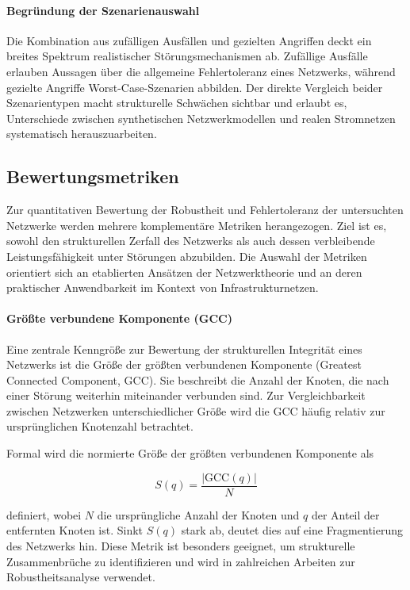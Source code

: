 \paragraph{Begründung der Szenarienauswahl}
Die Kombination aus zufälligen Ausfällen und gezielten Angriffen deckt ein
breites Spektrum realistischer Störungsmechanismen ab. Zufällige Ausfälle
erlauben Aussagen über die allgemeine Fehlertoleranz eines Netzwerks, während
gezielte Angriffe Worst-Case-Szenarien abbilden. Der direkte Vergleich beider
Szenarientypen macht strukturelle Schwächen sichtbar und erlaubt es,
Unterschiede zwischen synthetischen Netzwerkmodellen und realen Stromnetzen
systematisch herauszuarbeiten.


\subsection{Bewertungsmetriken}

Zur quantitativen Bewertung der Robustheit und Fehlertoleranz der
untersuchten Netzwerke werden mehrere komplementäre Metriken herangezogen.
Ziel ist es, sowohl den strukturellen Zerfall des Netzwerks als auch dessen
verbleibende Leistungsfähigkeit unter Störungen abzubilden. Die Auswahl der
Metriken orientiert sich an etablierten Ansätzen der Netzwerktheorie und an
deren praktischer Anwendbarkeit im Kontext von Infrastrukturnetzen.

\paragraph{Größte verbundene Komponente (GCC)}
Eine zentrale Kenngröße zur Bewertung der strukturellen Integrität eines
Netzwerks ist die Größe der größten verbundenen Komponente (Greatest Connected
Component, GCC). Sie beschreibt die Anzahl der Knoten, die nach einer Störung
weiterhin miteinander verbunden sind. Zur Vergleichbarkeit zwischen Netzwerken
unterschiedlicher Größe wird die GCC häufig relativ zur ursprünglichen
Knotenzahl betrachtet.

Formal wird die normierte Größe der größten verbundenen Komponente als


\[
S(q) = \frac{|\text{GCC}(q)|}{N}
\]


definiert, wobei $N$ die ursprüngliche Anzahl der Knoten und $q$ der Anteil der
entfernten Knoten ist. Sinkt $S(q)$ stark ab, deutet dies auf eine
Fragmentierung des Netzwerks hin. Diese Metrik ist besonders geeignet, um
strukturelle Zusammenbrüche zu identifizieren und wird in zahlreichen Arbeiten
zur Robustheitsanalyse verwendet.


